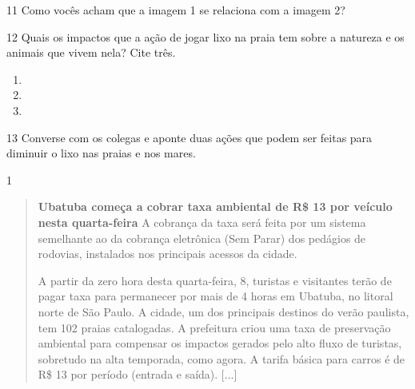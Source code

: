 \begin{itemize}
\begin{itemize}

\num{11} Como vocês acham que a imagem 1 se relaciona com a imagem 2?


\num{12} Quais os impactos que a ação de jogar lixo na praia tem sobre a natureza e os animais que vivem nela? Cite três.

\begin{enumerate}
\item {}

\item {}

\item {}
\end{enumerate}


\num{13} Converse com os colegas e aponte duas ações que podem ser feitas para
diminuir o lixo nas praias e nos mares.



\num{1}

\begin{quote}
\textbf{Ubatuba começa a cobrar taxa ambiental de R\$ 13 por veículo
nesta quarta-feira}
A cobrança da taxa será feita por um sistema semelhante ao da cobrança
eletrônica (Sem Parar) dos pedágios de rodovias, instalados nos
principais acessos da cidade.

A partir da zero hora desta quarta-feira, 8, turistas e visitantes terão
de pagar taxa para permanecer por mais de 4 horas em Ubatuba, no litoral
norte de São Paulo. A cidade, um dos principais destinos do verão
paulista, tem 102 praias catalogadas. A prefeitura criou uma taxa de
preservação ambiental para compensar os impactos gerados pelo alto fluxo
de turistas, sobretudo na alta temporada, como agora. A tarifa básica
para carros é de R\$ 13 por período (entrada e saída). [...]


\end{quote}
\end{itemize}
\end{itemize}
